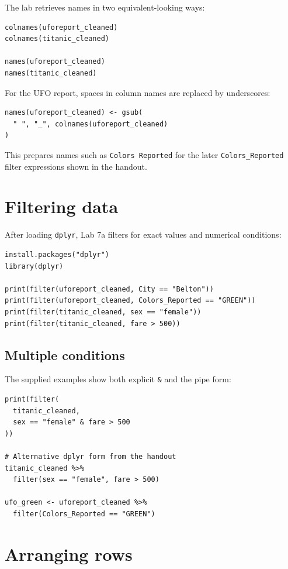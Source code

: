 The lab retrieves names in two equivalent-looking ways:

\begin{lstlisting}[style=dsr]
colnames(uforeport_cleaned)
colnames(titanic_cleaned)

names(uforeport_cleaned)
names(titanic_cleaned)
\end{lstlisting}

For the UFO report, spaces in column names are replaced by underscores:

\begin{lstlisting}[style=dsr]
names(uforeport_cleaned) <- gsub(
  " ", "_", colnames(uforeport_cleaned)
)
\end{lstlisting}

This prepares names such as \texttt{Colors Reported} for the later \texttt{Colors\_Reported} filter expressions shown in the handout.

\section{Filtering data}

After loading \texttt{dplyr}, Lab 7a filters for exact values and numerical conditions:

\begin{lstlisting}[style=dsr]
install.packages("dplyr")
library(dplyr)

print(filter(uforeport_cleaned, City == "Belton"))
print(filter(uforeport_cleaned, Colors_Reported == "GREEN"))
print(filter(titanic_cleaned, sex == "female"))
print(filter(titanic_cleaned, fare > 500))
\end{lstlisting}

\subsection{Multiple conditions}

The supplied examples show both explicit \texttt{\&} and the pipe form:

\begin{lstlisting}[style=dsr]
print(filter(
  titanic_cleaned,
  sex == "female" & fare > 500
))

# Alternative dplyr form from the handout
titanic_cleaned %>%
  filter(sex == "female", fare > 500)

ufo_green <- uforeport_cleaned %>%
  filter(Colors_Reported == "GREEN")
\end{lstlisting}

\section{Arranging rows}

